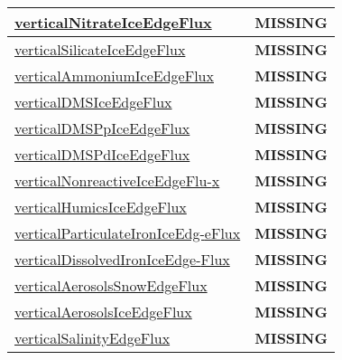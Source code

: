 {\begin{center}
\begin{longtable}{| p{2.0in} | p{4.0in} |}
    \hline
    \hyperref[subsec:var_sec_tracer_edge_fluxes_verticalNitrateIceEdgeFlux]{verticalNitrateIceEdgeFlux} & {\bf \color{red} MISSING} \\
    \hline
    \hyperref[subsec:var_sec_tracer_edge_fluxes_verticalSilicateIceEdgeFlux]{verticalSilicateIceEdgeFlux} & {\bf \color{red} MISSING} \\
    \hline
    \hyperref[subsec:var_sec_tracer_edge_fluxes_verticalAmmoniumIceEdgeFlux]{verticalAmmoniumIceEdgeFlux} & {\bf \color{red} MISSING} \\
    \hline
    \hyperref[subsec:var_sec_tracer_edge_fluxes_verticalDMSIceEdgeFlux]{verticalDMSIceEdgeFlux} & {\bf \color{red} MISSING} \\
    \hline
    \hyperref[subsec:var_sec_tracer_edge_fluxes_verticalDMSPpIceEdgeFlux]{verticalDMSPpIceEdgeFlux} & {\bf \color{red} MISSING} \\
    \hline
    \hyperref[subsec:var_sec_tracer_edge_fluxes_verticalDMSPdIceEdgeFlux]{verticalDMSPdIceEdgeFlux} & {\bf \color{red} MISSING} \\
    \hline
    \hyperref[subsec:var_sec_tracer_edge_fluxes_verticalNonreactiveIceEdgeFlux]{verticalNonreactiveIceEdgeFlu-}\hyperref[subsec:var_sec_tracer_edge_fluxes_verticalNonreactiveIceEdgeFlux]{x  }& {\bf \color{red} MISSING} \\
    \hline
    \hyperref[subsec:var_sec_tracer_edge_fluxes_verticalHumicsIceEdgeFlux]{verticalHumicsIceEdgeFlux} & {\bf \color{red} MISSING} \\
    \hline
    \hyperref[subsec:var_sec_tracer_edge_fluxes_verticalParticulateIronIceEdgeFlux]{verticalParticulateIronIceEdg-}\hyperref[subsec:var_sec_tracer_edge_fluxes_verticalParticulateIronIceEdgeFlux]{eFlux  }& {\bf \color{red} MISSING} \\
    \hline
    \hyperref[subsec:var_sec_tracer_edge_fluxes_verticalDissolvedIronIceEdgeFlux]{verticalDissolvedIronIceEdge-}\hyperref[subsec:var_sec_tracer_edge_fluxes_verticalDissolvedIronIceEdgeFlux]{Flux  }& {\bf \color{red} MISSING} \\
    \hline
    \hyperref[subsec:var_sec_tracer_edge_fluxes_verticalAerosolsSnowEdgeFlux]{verticalAerosolsSnowEdgeFlux} & {\bf \color{red} MISSING} \\
    \hline
    \hyperref[subsec:var_sec_tracer_edge_fluxes_verticalAerosolsIceEdgeFlux]{verticalAerosolsIceEdgeFlux} & {\bf \color{red} MISSING} \\
    \hline
    \hyperref[subsec:var_sec_tracer_edge_fluxes_verticalSalinityEdgeFlux]{verticalSalinityEdgeFlux} & {\bf \color{red} MISSING} \\
    \hline
\end{longtable}
\end{center}
}
